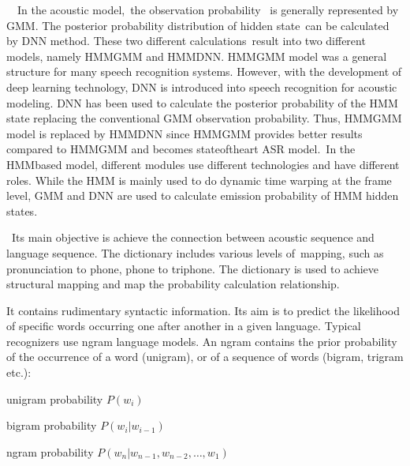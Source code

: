 \documentclass[letterpaper,10pt,english]{jupyterBook}
\begin{document}
\sphinxAtStartPar
{}  In the acoustic model, the observation
probability  is generally represented by GMM. The posterior probability
distribution of hidden state can be calculated by DNN method. These two
different calculations result into two different models, namely HMM\sphinxhyphen{}GMM
and HMM\sphinxhyphen{}DNN. HMM\sphinxhyphen{}GMM model was a general structure for many speech
recognition systems. However, with the development of deep learning
technology, DNN is introduced into speech recognition for acoustic
modeling. DNN has been used to calculate the posterior probability of
the HMM state replacing the conventional GMM observation probability.
Thus, HMM\sphinxhyphen{}GMM model is replaced by HMM\sphinxhyphen{}DNN since HMM\sphinxhyphen{}GMM provides better
results compared to HMM\sphinxhyphen{}GMM and becomes state\sphinxhyphen{}of\sphinxhyphen{}the\sphinxhyphen{}art ASR model. In
the HMM\sphinxhyphen{}based model, different modules use different technologies and
have different roles. While the HMM is mainly used to do dynamic time
warping at the frame level, GMM and DNN are used to calculate emission
probability of HMM hidden states.

\sphinxAtStartPar
{} Its main objective is achieve the connection
between acoustic sequence and language sequence. The dictionary includes
various levels of mapping, such as pronunciation to phone, phone to
trip\sphinxhyphen{}hone. The dictionary is used to achieve structural mapping and map
the probability calculation relationship.

\sphinxAtStartPar
{} It contains rudimentary syntactic information. Its
aim is to predict the likelihood of specific words occurring one after
another in a given language. Typical recognizers use n\sphinxhyphen{}gram language
models. An n\sphinxhyphen{}gram contains the prior probability of the occurrence of a
word (unigram), or of a sequence of words (bigram, trigram etc.):

\sphinxAtStartPar
unigram probability \( P(w_i) \)

\sphinxAtStartPar
bigram probability \( P(w_i|w_{i−1}) \)

\sphinxAtStartPar
ngram probability \( P(w_n|w_{n−1},w_{n−2}, …,w_1) \)
\end{document}
